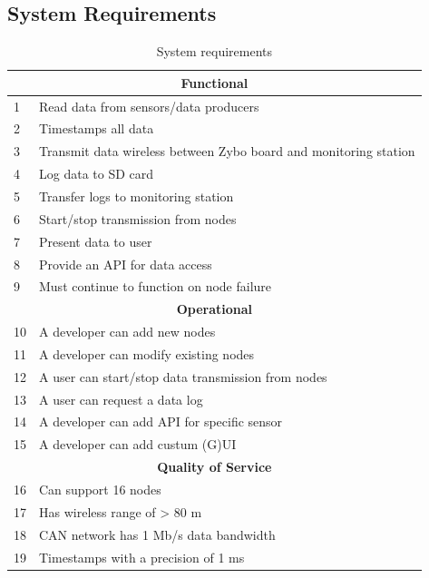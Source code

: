 \subsection{System Requirements} %
\label{sec:system_requirements}

\begin{table}[H]
\centering
\caption{System requirements}
\label{tab:requirements}

\begin{tabular}{ |p{0.3cm}|p{10.5cm}| }
\hline
\multicolumn{2}{|c|}{\textbf{Functional}}\\
\hline
1 & Read data from sensors/data producers 				\\
2 & Timestamps all data 								\\
3 & Transmit data wireless between Zybo board and monitoring station	\\
4 & Log data to SD card 								\\
5 & Transfer logs to monitoring station 								\\
6 & Start/stop transmission from nodes 					\\
7 & Present data to user								\\
8 & Provide an API for data access						\\
9 & Must continue to function on node failure			\\

\hline
\multicolumn{2}{|c|}{\textbf{Operational}}\\
\hline	
10 & A developer can add new nodes 										 \\
11 & A developer can modify existing nodes 								 \\
12 & A user can start/stop data transmission from nodes					 \\
13 & A user can request a data log 										 \\
14 & A developer can add API for specific sensor 						 \\
15 & A developer can add custum (G)UI									 \\


\hline
\multicolumn{2}{|c|}{\textbf{Quality of Service}}\\
\hline	
16 & Can support 16 nodes							 					\\
17 & Has wireless range of > 80 m						 				\\
18 & CAN network has 1 Mb/s data bandwidth			 					\\
19 & Timestamps with a precision of 1 ms 			 					\\


\end{tabular}
\end{table}
